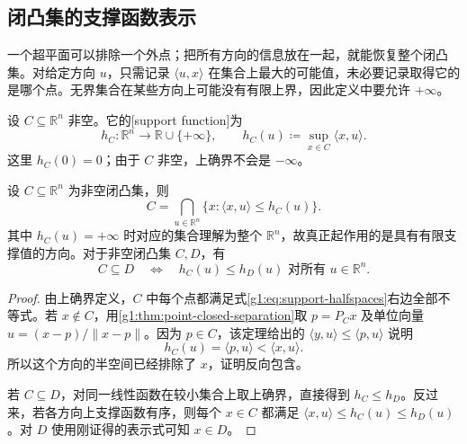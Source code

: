 \subsection{闭凸集的支撑函数表示}
\label{g1:subsec:0301:04}

一个超平面可以排除一个外点；把所有方向的信息放在一起，就能恢复整个闭凸集。对给定方向 \(u\)，只需记录 \(\langle u,x\rangle\) 在集合上最大的可能值，未必要记录取得它的是哪个点。无界集合在某些方向上可能没有有限上界，因此定义中要允许 \(+\infty\)。

\begin{definition}\label{g1:def:support-function}
	设 \(C\subseteq\mathbb R^n\) 非空。它的[support function]为
	\[
		h_C:\mathbb R^n\longrightarrow\mathbb R\cup\{+\infty\},\qquad
		h_C(u)\coloneqq\sup_{x\in C}\langle x,u\rangle.
	\]
	这里 \(h_C(0)=0\)；由于 \(C\) 非空，上确界不会是 \(-\infty\)。
\end{definition}

\begin{proposition}\label{g1:prop:support-function-representation}
	设 \(C\subseteq\mathbb R^n\) 为非空闭凸集，则
	\begin{equation}\label{g1:eq:support-halfspaces}
		C=\bigcap_{u\in\mathbb R^n}\{x:\langle x,u\rangle\leq h_C(u)\}.
	\end{equation}
	其中 \(h_C(u)=+\infty\) 时对应的集合理解为整个 \(\mathbb R^n\)，故真正起作用的是具有有限支撑值的方向。对于非空闭凸集 \(C,D\)，有
	\[
		C\subseteq D\quad\Longleftrightarrow\quad h_C(u)\leq h_D(u)\text{ 对所有 }u\in\mathbb R^n.
	\]
\end{proposition}
\begin{proof}
	由上确界定义，\(C\) 中每个点都满足式\eqref{g1:eq:support-halfspaces}右边全部不等式。若 \(x\notin C\)，用\cref{g1:thm:point-closed-separation}取 \(p=P_Cx\) 及单位向量 \(u=(x-p)/\lVert x-p\rVert\)。因为 \(p\in C\)，该定理给出的 \(\langle y,u\rangle\leq\langle p,u\rangle\) 说明
	\[
		h_C(u)=\langle p,u\rangle<\langle x,u\rangle.
	\]
	所以这个方向的半空间已经排除了 \(x\)，证明反向包含。

	若 \(C\subseteq D\)，对同一线性函数在较小集合上取上确界，直接得到 \(h_C\leq h_D\)。反过来，若各方向上支撑函数有序，则每个 \(x\in C\) 都满足 \(\langle x,u\rangle\leq h_C(u)\leq h_D(u)\)。对 \(D\) 使用刚证得的表示式可知 \(x\in D\)。
\end{proof}

